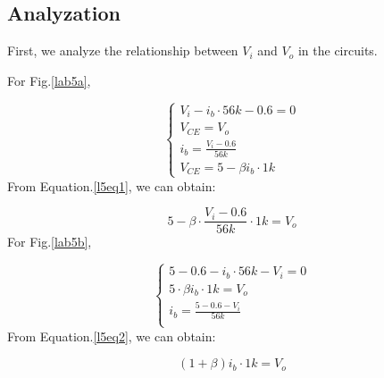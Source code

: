     \subsection{Analyzation}
    First, we analyze the relationship between $V_i$ and $V_o$ in the circuits.\par
    For Fig.\ref{lab5a},\par
    \begin{equation}
        \begin{cases}
            V_i-i_b\cdot56k-0.6=0\\
            V_{CE}=V_o\\
            i_b = \frac{V_i-0.6}{56k}\\
            V_{CE}=5-\beta i_b\cdot 1k
        \end{cases}
    \label{l5eq1}
    \end{equation}
    From Equation.\ref{l5eq1}, we can obtain:\par
    \begin{equation*}
        5-\beta \cdot \frac{V_i-0.6}{56k}\cdot 1k=V_o
    \end{equation*}
    For Fig.\ref{lab5b},\par
    \begin{equation}
        \begin{cases}
            5-0.6-i_b\cdot56k-V_i=0\\
            5\cdot\beta i_b\cdot1k=V_o\\
            i_b = \frac{5-0.6-V_i}{56k}\\
        \end{cases}
    \label{l5eq2}
    \end{equation}
    From Equation.\ref{l5eq2}, we can obtain:\par
    \begin{equation*}
        (1+\beta) i_b\cdot 1k=V_o
    \end{equation*}

    
